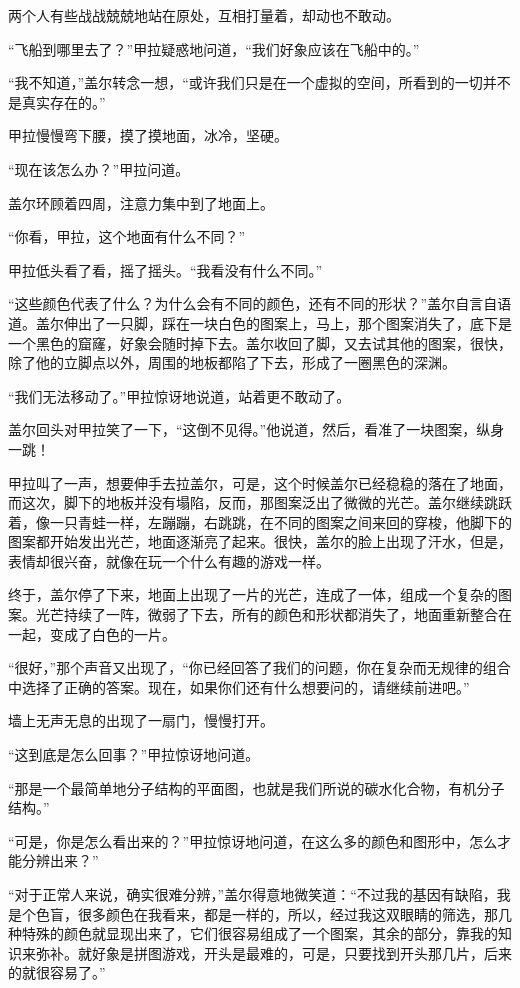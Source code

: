 两个人有些战战兢兢地站在原处，互相打量着，却动也不敢动。 

“飞船到哪里去了？”甲拉疑惑地问道，“我们好象应该在飞船中的。” 

“我不知道，”盖尔转念一想，“或许我们只是在一个虚拟的空间，所看到的一切并不是真实存在的。” 

甲拉慢慢弯下腰，摸了摸地面，冰冷，坚硬。 

“现在该怎么办？”甲拉问道。 

盖尔环顾着四周，注意力集中到了地面上。 

“你看，甲拉，这个地面有什么不同？” 

甲拉低头看了看，摇了摇头。“我看没有什么不同。” 

“这些颜色代表了什么？为什么会有不同的颜色，还有不同的形状？”盖尔自言自语道。盖尔伸出了一只脚，踩在一块白色的图案上，马上，那个图案消失了，底下是一个黑色的窟窿，好象会随时掉下去。盖尔收回了脚，又去试其他的图案，很快，除了他的立脚点以外，周围的地板都陷了下去，形成了一圈黑色的深渊。 

“我们无法移动了。”甲拉惊讶地说道，站着更不敢动了。 

盖尔回头对甲拉笑了一下，“这倒不见得。”他说道，然后，看准了一块图案，纵身一跳！ 

甲拉叫了一声，想要伸手去拉盖尔，可是，这个时候盖尔已经稳稳的落在了地面，而这次，脚下的地板并没有塌陷，反而，那图案泛出了微微的光芒。盖尔继续跳跃着，像一只青蛙一样，左蹦蹦，右跳跳，在不同的图案之间来回的穿梭，他脚下的图案都开始发出光芒，地面逐渐亮了起来。很快，盖尔的脸上出现了汗水，但是，表情却很兴奋，就像在玩一个什么有趣的游戏一样。 

终于，盖尔停了下来，地面上出现了一片的光芒，连成了一体，组成一个复杂的图案。光芒持续了一阵，微弱了下去，所有的颜色和形状都消失了，地面重新整合在一起，变成了白色的一片。 

“很好，”那个声音又出现了，“你已经回答了我们的问题，你在复杂而无规律的组合中选择了正确的答案。现在，如果你们还有什么想要问的，请继续前进吧。” 

墙上无声无息的出现了一扇门，慢慢打开。 

“这到底是怎么回事？”甲拉惊讶地问道。 

“那是一个最简单地分子结构的平面图，也就是我们所说的碳水化合物，有机分子结构。” 

“可是，你是怎么看出来的？”甲拉惊讶地问道，在这么多的颜色和图形中，怎么才能分辨出来？” 

“对于正常人来说，确实很难分辨，”盖尔得意地微笑道：“不过我的基因有缺陷，我是个色盲，很多颜色在我看来，都是一样的，所以，经过我这双眼睛的筛选，那几种特殊的颜色就显现出来了，它们很容易组成了一个图案，其余的部分，靠我的知识来弥补。就好象是拼图游戏，开头是最难的，可是，只要找到开头那几片，后来的就很容易了。” 

